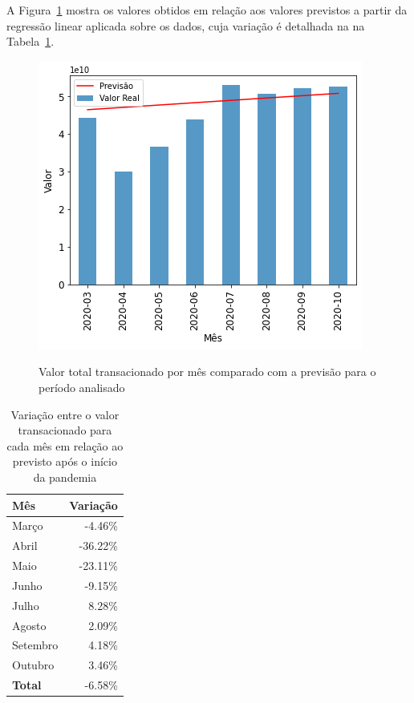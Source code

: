 A Figura~\ref{fig:pandemia:base-de-dados-18.2-valor-total-vs-previsao} mostra os valores obtidos em relação aos valores previstos a partir da regressão linear aplicada sobre os dados, cuja variação é detalhada na na Tabela~\ref{tab:pandemia:valor-total-vs-previsao}.

\begin{figure}[htb]
	\centering
    \caption{Valor total transacionado por mês comparado com a previsão para o período analisado}
    \includegraphics[scale=0.7]{images/base-de-dados-18.2-valor-total-vs-previsao.png}
    \label{fig:pandemia:base-de-dados-18.2-valor-total-vs-previsao}
    \fdadospesquisa
\end{figure}

\begin{table}[htb]
\centering
\caption{Variação entre o valor transacionado para cada mês em relação ao previsto após o início da pandemia}
\label{tab:pandemia:valor-total-vs-previsao}
\begin{tabular}{lr}
\toprule
Mês & Variação \\
\midrule
Março &     -4.46\% \\
Abril &    -36.22\% \\
Maio &     -23.11\% \\
Junho &     -9.15\% \\
Julho &      8.28\% \\
Agosto &     2.09\% \\
Setembro &   4.18\% \\
Outubro &    3.46\% \\ \hline
\textbf{Total} & -6.58\% \\
\bottomrule
\end{tabular}
\fdadospesquisa
\end{table}

